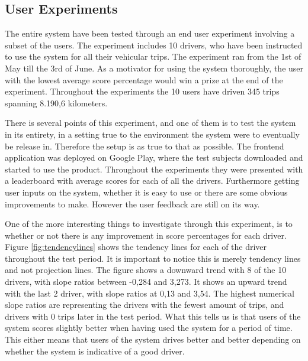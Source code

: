 \subsection{User Experiments}\label{subsec:userexp}

The entire system have been tested through an end user experiment involving a subset of the users. The experiment includes 10 drivers, who have been instructed to use the system for all their vehicular trips. The experiment ran from the 1st of May till the 3rd of June. As a motivator for using the system thoroughly, the user with the lowest average score percentage would win a prize at the end of the experiment. Throughout the experiments the 10 users have driven 345 trips spanning 8.190,6 kilometers.

There is several points of this experiment, and one of them is to test the system in its entirety, in a setting true to the environment the system were to eventually be release in. Therefore the setup is as true to that as possible. The frontend application was deployed on Google Play, where the test subjects downloaded and started to use the product. Throughout the experiments they were presented with a leaderboard with average scores for each of all the drivers. 
Furthermore getting user inputs on the system, whether it is easy to use or there are some obvious improvements to make. However the user feedback are still on its way.

One of the more interesting things to investigate through this experiment, is to whether or not there is any improvement in score percentages for each driver. Figure \ref{fig:tendencylines} shows the tendency lines for each of the driver throughout the test period. It is important to notice this is merely tendency lines and not projection lines. The figure shows a downward trend with 8 of the 10 drivers, with  slope ratios between -0,284 and 3,273. It shows an upward trend with the last 2 driver, with slope ratios at 0,13 and 3,54. The highest numerical slope ratios are representing the drivers with the fewest amount of trips, and drivers with 0 trips later in the test period. What this tells us is that users of the system scores slightly better when having used the system for a period of time. This either means that users of the system drives better and better depending on whether the system is indicative of a good driver.

